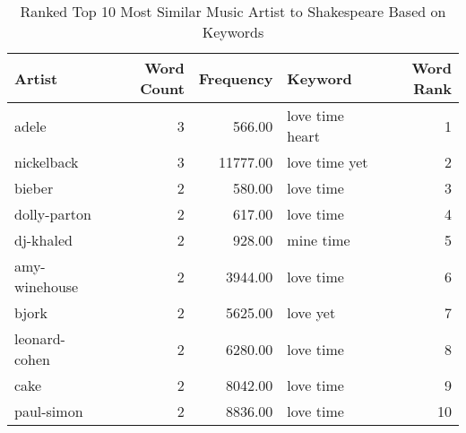 \begin{table}[ht]
\centering
\begin{tabular}{lrrlr}
  \hline
Artist & Word Count & Frequency & Keyword & Word Rank \\ 
  \hline
adele &   3 & 566.00 &  love time heart &   1 \\ 
  nickelback &   3 & 11777.00 &  love time yet &   2 \\ 
  bieber &   2 & 580.00 &  love time &   3 \\ 
  dolly-parton &   2 & 617.00 &  love time &   4 \\ 
  dj-khaled &   2 & 928.00 &  mine time &   5 \\ 
  amy-winehouse &   2 & 3944.00 &  love time &   6 \\ 
  bjork &   2 & 5625.00 &  love yet &   7 \\ 
  leonard-cohen &   2 & 6280.00 &  love time &   8 \\ 
  cake &   2 & 8042.00 &  love time &   9 \\ 
  paul-simon &   2 & 8836.00 &  love time &  10 \\ 
   \hline
\end{tabular}
\caption{Ranked Top 10 Most Similar Music Artist to Shakespeare Based on Keywords} 
\label{tab:wordranktable}
\end{table}

